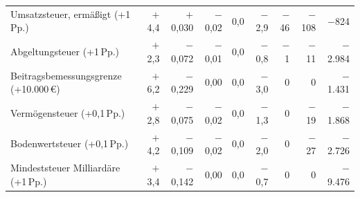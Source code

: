 \begin{tabular}{@{}l*{8}{r}@{}}
Umsatzsteuer, ermäßigt (+1\,Pp.) & $+$4,4 & $+$0,030 & $-$0,02 & 0,0 & $-$2,9 & $-$46 & $-$108 & $-$824 \\
Abgeltungsteuer (+1\,Pp.) & $+$2,3 & $-$0,072 & $-$0,01 & 0,0 & $-$0,8 & $-$1 & $-$11 & $-$2.984 \\
Beitragsbemessungsgrenze (+10.000\,\euro{}) & $+$6,2 & $-$0,229 & 0,00 & 0,0 & $-$3,0 & 0 & 0 & $-$1.431 \\
Vermögensteuer (+0,1\,Pp.) & $+$2,8 & $-$0,075 & $-$0,02 & 0,0 & $-$1,3 & 0 & $-$19 & $-$1.868 \\
Bodenwertsteuer (+0,1\,Pp.) & $+$4,2 & $-$0,109 & $-$0,02 & 0,0 & $-$2,0 & 0 & $-$27 & $-$2.726 \\
Mindeststeuer Milliardäre (+1\,Pp.) & $+$3,4 & $-$0,142 & 0,00 & 0,0 & $-$0,7 & 0 & 0 & $-$9.476 \\
\bottomrule
\end{tabular}
